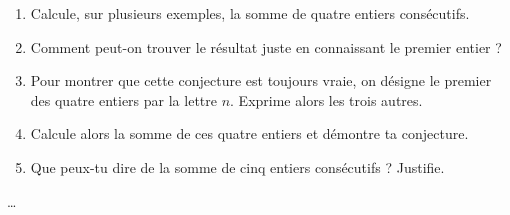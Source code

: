 \begin{exercice*}
    \begin{enumerate}
        \item Calcule, sur plusieurs exemples, la somme de quatre entiers consécutifs.

        \item Comment peut-on trouver le résultat juste en connaissant le premier entier ?

        \item Pour montrer que cette conjecture est toujours vraie, on désigne le premier des quatre entiers par la lettre $n$. Exprime alors les trois autres.

        \item Calcule alors la somme de ces quatre entiers et démontre ta conjecture.

        \item Que peux-tu dire de la somme de cinq entiers consécutifs ? Justifie.
    \end{enumerate}
\end{exercice*}
\begin{corrige}
    \dots
\end{corrige}

